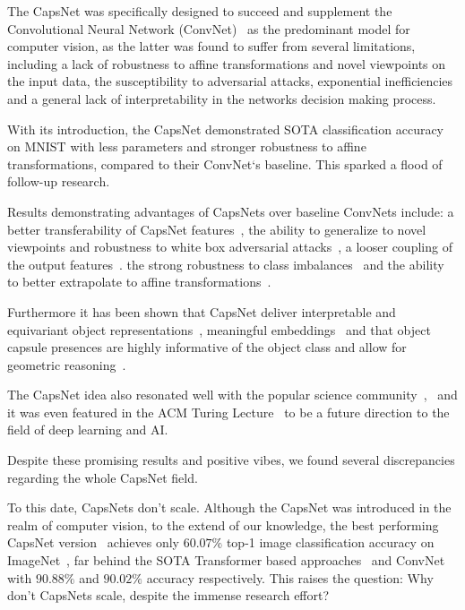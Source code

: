 \documentclass{article}
\begin{document}
The CapsNet was specifically designed to succeed and supplement the Convolutional Neural Network (ConvNet)~\cite{neco/LeCunBDHHHJ89} as the predominant model for computer vision, as the latter was found to suffer from several limitations, including
a lack of robustness to affine transformations and novel viewpoints on the input data, 
the susceptibility to adversarial attacks,
exponential inefficiencies
and a general lack of interpretability in the networks decision making process.

With its introduction, the CapsNet demonstrated SOTA classification accuracy on MNIST with less parameters and stronger robustness to affine transformations, compared to their ConvNet`s baseline. This sparked a flood of follow-up research.

Results demonstrating advantages of CapsNets over baseline ConvNets include:
a better transferability of CapsNet features~\cite{corr/Ancheng2018},
the ability to generalize to novel viewpoints and robustness to white box adversarial attacks~\cite{iclr/HintonSF18},
a looser coupling of the output features~\cite{corr/Lin2018}.
the strong robustness to class imbalances~\cite{miccai/Jimenez-Sanchez18} and
the ability to better extrapolate to affine transformations~\cite{cvpr/GuT20}.

Furthermore it has been shown that CapsNet deliver interpretable and equivariant object representations~\cite{nips/LenssenFL18}, meaningful embeddings~\cite{corr/Lin2018} and that object capsule presences are highly informative of the object class and allow for geometric reasoning~\cite{nips/KosiorekSTH19}.

The CapsNet idea also resonated well with the popular science community~\cite{book/hawkins2021},~\cite{book/Hiesinger2021} and it was even featured in the ACM Turing Lecture~\cite{comacm/Bengio2021} to be a future direction to the field of deep learning and AI.

Despite these promising results and positive vibes, we found several discrepancies regarding the whole CapsNet field.

To this date, CapsNets don't scale. Although the CapsNet was introduced in the realm of computer vision, to the extend of our knowledge, the best performing CapsNet version~\cite{nips/AhmedT19} achieves only $60.07\%$ top-1 image classification accuracy on ImageNet~\cite{data/imagenet}, far behind the SOTA Transformer based approaches~\cite{corr/Wortsman2022} and  ConvNet~\cite{cvpr/Pham2021} with $90.88\%$ and  $90.02\%$ accuracy respectively.
This raises the question: Why don't CapsNets scale, despite the immense research effort?
\end{document}

